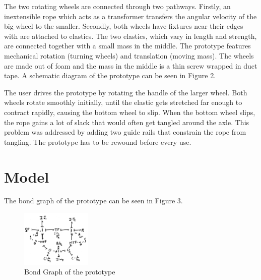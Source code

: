 \documentclass[twoside,twocolumn]{article}
\begin{document}
The two rotating wheels are connected through two pathways. Firstly, an inextensible rope which acts as a transformer transfers the angular velocity of the big wheel to the smaller. Secondly, both wheels have fixtures near their edges with are attached to elastics. The two elastics, which vary in length and strength, are connected together with a small mass in the middle. The prototype features mechanical rotation (turning wheels) and translation (moving mass). The wheels are made out of foam and the mass in the middle is a thin screw wrapped in duct tape. A schematic diagram of the prototype can be seen in Figure 2.


The user drives the prototype by rotating the handle of the larger wheel. Both wheels rotate smoothly initially, until the elastic gets stretched far enough to contract rapidly, causing the bottom wheel to slip. When the bottom wheel slips, the rope gains a lot of slack that would often get tangled around the axle. This problem was addressed by adding two guide rails that constrain the rope from tangling. The prototype has to be rewound before every use.



\section{Model}

The bond graph of the prototype can be seen in Figure 3.
\begin{figure}[!h]
    \caption{Bond Graph of the prototype}
    \centering
        \includegraphics[width=0.3\textwidth]{bg.png}
\end{figure}
\end{document}
